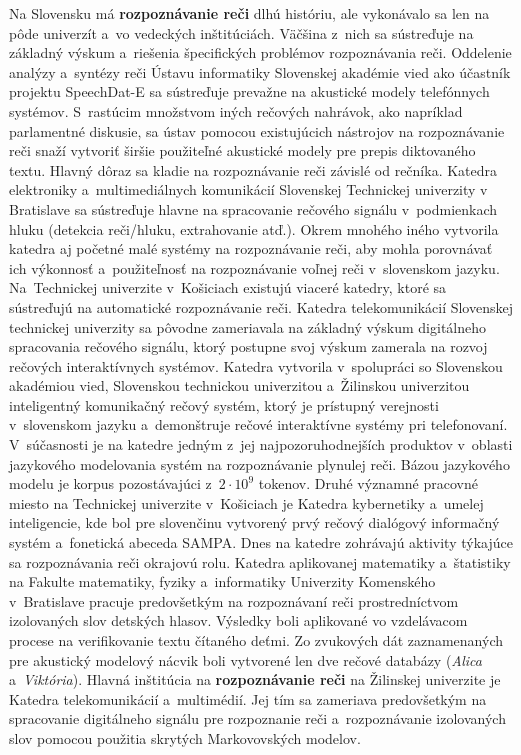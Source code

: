\begin{multicols}{2}
Na Slovensku má \textbf{rozpoznávanie reči} dlhú históriu, ale vykonávalo sa len na pôde univerzít a~vo vedeckých inštitúciách. Väčšina z~nich sa sústreďuje na základný výskum a~riešenia špecifických problémov rozpoznávania reči. Oddelenie analýzy a~syntézy reči Ústavu informatiky Slovenskej akadémie vied ako účastník projektu SpeechDat-E sa sústreďuje prevažne na akustické modely telefónnych systémov. S~rastúcim množstvom iných rečových nahrávok, ako napríklad parlamentné diskusie, sa ústav pomocou existujúcich nástrojov na rozpoznávanie reči snaží vytvoriť širšie použiteľné akustické modely pre  prepis diktovaného textu. Hlavný dôraz sa kladie na rozpoznávanie reči závislé od rečníka. Katedra elektroniky a~multimediálnych komunikácií Slovenskej Technickej univerzity v Bratislave sa sústreďuje hlavne na spracovanie rečového signálu v~podmienkach hluku (detekcia reči/hluku, extrahovanie atď.). Okrem mnohého iného vytvorila katedra aj početné malé systémy na rozpoznávanie reči, aby mohla porovnávať ich výkonnosť a~použiteľnosť na rozpoznávanie voľnej reči v~slovenskom jazyku. Na~Technickej univerzite v~Košiciach existujú viaceré katedry, ktoré sa sústreďujú na automatické rozpoznávanie reči. Katedra telekomunikácií Slovenskej technickej univerzity sa pôvodne zameriavala na základný výskum digitálneho spracovania rečového signálu, ktorý postupne svoj výskum zamerala na rozvoj rečových interaktívnych systémov.
\newline Katedra vytvorila v~spolupráci so Slovenskou akadémiou vied, Slovenskou technickou univerzitou a~Žilinskou univerzitou inteligentný komunikačný rečový systém, ktorý je prístupný verejnosti v~slovenskom jazyku a~demonštruje rečové interaktívne systémy pri telefonovaní. V~súčasnosti je na katedre jedným z~jej najpozoruhodnejších produktov v~oblasti jazykového modelovania systém na rozpoznávanie plynulej reči. Bázou jazykového modelu  je korpus pozostávajúci z~$2\cdot 10^9$ tokenov. 
\newline Druhé významné pracovné miesto na Technickej univerzite v~Košiciach je Katedra kybernetiky a~umelej inteligencie, kde bol pre slovenčinu vytvorený prvý rečový dialógový informačný systém a~fonetická abeceda SAMPA. Dnes na katedre zohrávajú aktivity týkajúce sa rozpoznávania reči okrajovú rolu. Katedra aplikovanej matematiky a~štatistiky na Fakulte matematiky, fyziky a~informatiky Univerzity Komenského v~Bratislave pracuje predovšetkým na rozpoznávaní reči prostredníctvom izolovaných slov detských hlasov. Výsledky boli aplikované vo vzdelávacom procese na verifikovanie textu čítaného deťmi. Zo zvukových dát zaznamenaných pre akustický modelový nácvik boli vytvorené len dve rečové databázy (\emph{Alica} a~\emph{Viktória}).  Hlavná inštitúcia na \textbf{rozpoznávanie reči} na Žilinskej univerzite je Katedra telekomunikácií a~multimédií. Jej tím sa zameriava predovšetkým na spracovanie digitálneho signálu pre rozpoznanie reči a~rozpoznávanie izolovaných slov pomocou použitia skrytých Markovovských modelov.


\end{multicols}
